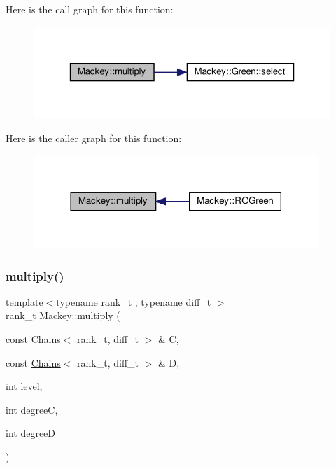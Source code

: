 Here is the call graph for this function\+:\nopagebreak
\begin{figure}[H]
\begin{center}
\leavevmode
\includegraphics[width=323pt]{namespaceMackey_a80dbde3a859378ede596b48869ec50d9_cgraph}
\end{center}
\end{figure}
Here is the caller graph for this function\+:\nopagebreak
\begin{figure}[H]
\begin{center}
\leavevmode
\includegraphics[width=305pt]{namespaceMackey_a80dbde3a859378ede596b48869ec50d9_icgraph}
\end{center}
\end{figure}
\mbox{\label{namespaceMackey_a2eca4cc709501ad3fc20b82fe4bcbd33}} 
\subsubsection{\texorpdfstring{multiply()}{multiply()}\hspace{0.1cm}{\footnotesize\ttfamily [2/2]}}
{\footnotesize\ttfamily template$<$typename rank\+\_\+t , typename diff\+\_\+t $>$ \\
rank\+\_\+t Mackey\+::multiply (\begin{DoxyParamCaption}\item[{const \hyperlink{classMackey_1_1Chains}{Chains}$<$ rank\+\_\+t, diff\+\_\+t $>$ \&}]{C,  }\item[{const \hyperlink{classMackey_1_1Chains}{Chains}$<$ rank\+\_\+t, diff\+\_\+t $>$ \&}]{D,  }\item[{int}]{level,  }\item[{int}]{degreeC,  }\item[{int}]{degreeD }\end{DoxyParamCaption})}

